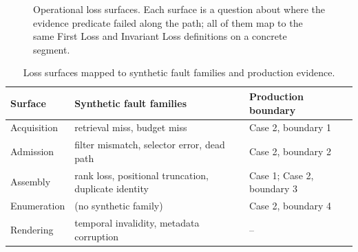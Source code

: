 \documentclass[10pt]{article}
\newcommand{\NA}{--}
\begin{document}
\begin{figure}[t]
\centering
{}
\caption{Operational loss surfaces. Each surface is a question about where the evidence predicate failed along the path; all of them map to the same First Loss and Invariant Loss definitions on a concrete segment.}
\label{fig:surfaces}
\end{figure}

\begin{table}[t]
\centering
\caption{Loss surfaces mapped to synthetic fault families and production evidence.}
\label{tab:surfaces}
\begin{tabular}{lll}
\toprule
Surface & Synthetic fault families & Production boundary \\
\midrule
Acquisition & retrieval miss, budget miss & Case 2, boundary 1 \\
Admission & filter mismatch, selector error, dead path & Case 2, boundary 2 \\
Assembly & rank loss, positional truncation, duplicate identity & Case 1; Case 2, boundary 3 \\
Enumeration & (no synthetic family) & Case 2, boundary 4 \\
Rendering & temporal invalidity, metadata corruption & \NA \\
\bottomrule
\end{tabular}
\end{table}
\end{document}
